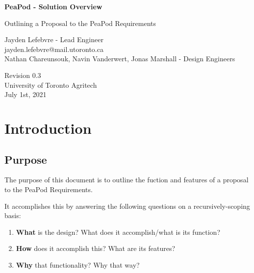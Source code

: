 \documentclass{report}
\begin{document}
\begin{titlepage}
    \begin{center}
        \vspace*{1.2cm}

        \textbf{\large{PeaPod - Solution Overview}}

        \vspace{0.5cm}

        Outlining a Proposal to the PeaPod Requirements

        \vfill

        Jayden Lefebvre - Lead Engineer\\\small{jayden.lefebvre@mail.utoronto.ca}\\
        \vspace{1cm}
        Nathan Chareunsouk, Navin Vanderwert, Jonas Marshall - Design Engineers

        \vspace{2.5cm}

        Revision 0.3\\
        University of Toronto Agritech\\
        July 1st, 2021

    \end{center}
\end{titlepage}

\thispagestyle{plain}

\tableofcontents
\newpage

\section{Introduction}
\label{sec:intro}

\subsection{Purpose}
\label{sec:purpose}

The purpose of this document is to outline the fuction and features of a proposal to the PeaPod Requirements.

It accomplishes this by answering the following questions on a recursively-scoping basis:
\begin{enumerate}
    \item \textbf{What} is the design? What does it accomplish/what is its function? 
    \item \textbf{How} does it accomplish this? What are its features? 
    \item \textbf{Why} that functionality? Why that way?
\end{enumerate}
\end{document}
